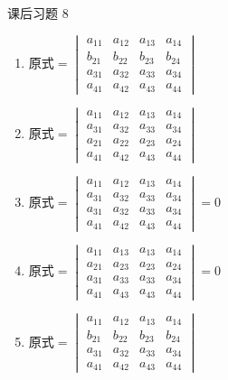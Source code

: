 \begin{problem}
	课后习题 8
	\begin{solution}
		\begin{enumerate}
			\item $\displaystyle\text{原式} = \begin{vmatrix}
				a_{11} & a_{12} & a_{13} & a_{14} \\
				b_{21} & b_{22} & b_{23} & b_{24} \\
				a_{31} & a_{32} & a_{33} & a_{34} \\
				a_{41} & a_{42} & a_{43} & a_{44}
			\end{vmatrix}$
			\item $\displaystyle\text{原式} = \begin{vmatrix}
				a_{11} & a_{12} & a_{13} & a_{14} \\
				a_{31} & a_{32} & a_{33} & a_{34} \\
				a_{21} & a_{22} & a_{23} & a_{24} \\
				a_{41} & a_{42} & a_{43} & a_{44}
			\end{vmatrix}$
			\item $\displaystyle\text{原式} = \begin{vmatrix}
				a_{11} & a_{12} & a_{13} & a_{14} \\
				a_{31} & a_{32} & a_{33} & a_{34} \\
				a_{31} & a_{32} & a_{33} & a_{34} \\
				a_{41} & a_{42} & a_{43} & a_{44}
			\end{vmatrix} = 0$
			\item $\displaystyle\text{原式} = \begin{vmatrix}
				a_{11} & a_{13} & a_{13} & a_{14} \\
				a_{21} & a_{23} & a_{23} & a_{24} \\
				a_{31} & a_{33} & a_{33} & a_{34} \\
				a_{41} & a_{43} & a_{43} & a_{44}
			\end{vmatrix} = 0$
			\item $\displaystyle\text{原式} = \begin{vmatrix}
				a_{11} & a_{12} & a_{13} & a_{14} \\
				b_{21} & b_{22} & b_{23} & b_{24} \\
				a_{31} & a_{32} & a_{33} & a_{34} \\
				a_{41} & a_{42} & a_{43} & a_{44}
			\end{vmatrix}$
		\end{enumerate}
	\end{solution}
\end{problem}

